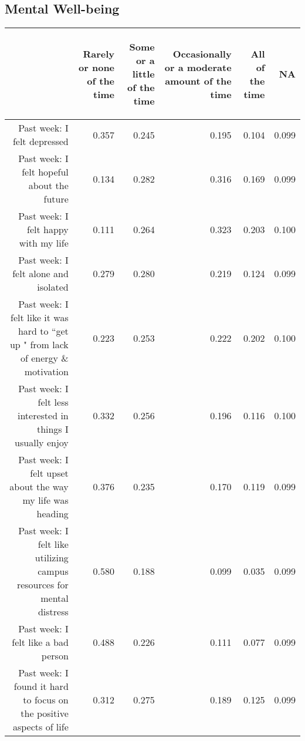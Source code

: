 \documentclass{article}\usepackage[]{graphicx}\usepackage[]{color}
\begin{document}
\subsection{Mental Well-being}
\begin{table}[ht]
\centering
\begin{tabular}{rrrrrr}
  \hline
 & \begin{sideways} Rarely or none of the time \end{sideways} & \begin{sideways} Some or a little of the time \end{sideways} & \begin{sideways} Occasionally or a moderate amount of the time \end{sideways} & \begin{sideways} All of the time \end{sideways} & \begin{sideways} NA \end{sideways} \\ 
  \hline
Past week: I felt depressed & 0.357 & 0.245 & 0.195 & 0.104 & 0.099 \\ 
  Past week: I felt hopeful about the future & 0.134 & 0.282 & 0.316 & 0.169 & 0.099 \\ 
  Past week: I felt happy with my life & 0.111 & 0.264 & 0.323 & 0.203 & 0.100 \\ 
  Past week: I felt alone and isolated & 0.279 & 0.280 & 0.219 & 0.124 & 0.099 \\ 
  Past week: I felt like it was hard to ``get up " from lack of energy \& motivation & 0.223 & 0.253 & 0.222 & 0.202 & 0.100 \\ 
  	Past week: I felt less interested in things I usually enjoy & 0.332 & 0.256 & 0.196 & 0.116 & 0.100 \\ 
  	Past week: I felt upset about the way my life was heading & 0.376 & 0.235 & 0.170 & 0.119 & 0.099 \\ 
  Past week: I felt like utilizing campus resources for mental distress & 0.580 & 0.188 & 0.099 & 0.035 & 0.099 \\ 
  Past week: I felt like a bad person & 0.488 & 0.226 & 0.111 & 0.077 & 0.099 \\ 
  Past week: I found it hard to focus on the positive aspects of life & 0.312 & 0.275 & 0.189 & 0.125 & 0.099 \\ 
   \hline
\end{tabular}
\end{table}
\end{document}
